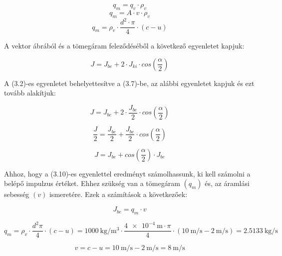 \begin{equation}
q_m=q_v\cdot{\rho_v}
\end{equation}
\begin{equation}
q_m=A\cdot{v}\cdot{\rho_v}
\end{equation}
\begin{equation}
q_m={\rho_v}\cdot{\frac{d^2\cdot{\pi}}{4}}\cdot(c-u)
\end{equation}


\noindent A vektor ábrából és a tömegáram feleződéséből a következő egyenletet kapjuk:

\begin{equation}
J=J_{be}+2\cdot{J_{ki}\cdot{cos\left(\frac{\alpha}{2}\right)}}
\end{equation}

\noindent A (3.2)-es egyenletet behelyettesítve a (3.7)-be, az alábbi egyenletet kapjuk és ezt tovább alakítjuk:

\begin{equation}
J=J_{be}+2\cdot\frac{J_{be}}{2}\cdot{cos\left(\frac{\alpha}{2}\right)}
\end{equation}

\begin{equation}
\frac{J}{2}=\frac{J_{be}}{2}+\frac{J_{be}}{2}\cdot{cos\left(\frac{\alpha}{2}\right)}
\end{equation}

\begin{equation}
J=J_{be}+{cos\left(\frac{\alpha}{2}\right)}\cdot{J_{be}}
\end{equation}

\noindent Ahhoz, hogy a (3.10)-es egyenlettel eredményt számolhassunk, ki kell számolni a belépő impulzus értéket. Ehhez szükség van a tömegáram $(q_m)$ és, az áramlási sebesség $(v)$ ismeretére. Ezek a számítások a következőek:

\begin{equation}
J_{be}=q_m\cdot{v}
\end{equation}

\begin{equation}
q_m=\rho_v\cdot{\frac{d^2{\pi}}{4}}\cdot(c-u)=\SI{1000}{\kilo\gram\per\meter\cubed}\cdot{\frac{{\SI{4e-4}{\meter}\cdot{\pi}}}{4}}\cdot(\SI{10}{\meter\per\second}-\SI{2}{\meter\per\second})=\SI{2,5133}{\kilo\gram\per\second}
\end{equation}

\begin{equation}
v=c-u=\SI{10}{\meter\per\second}-\SI{2}{\meter\per\second}=\SI{8}{\meter\per\second}
\end{equation}

